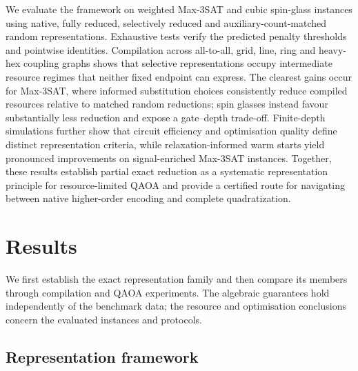 \documentclass[a4paper,onecolumn,11pt,unpublished]{quantumarticle}
\theoremstyle{remark}
\begin{document}
We evaluate the framework on weighted Max-3SAT and cubic spin-glass instances
using native, fully reduced, selectively reduced and auxiliary-count-matched
random representations. Exhaustive tests verify the predicted penalty
thresholds and pointwise identities. Compilation across all-to-all, grid,
line, ring and heavy-hex coupling graphs shows that selective representations
occupy intermediate resource regimes that neither fixed endpoint can express.
The clearest gains occur for Max-3SAT, where informed substitution choices
consistently reduce compiled resources relative to matched random reductions;
spin glasses instead favour substantially less reduction and expose a
gate--depth trade-off. Finite-depth simulations further show that circuit
efficiency and optimisation quality define distinct representation criteria,
while relaxation-informed warm starts yield pronounced improvements on
signal-enriched Max-3SAT instances. Together, these results establish partial
exact reduction as a systematic representation principle for resource-limited
QAOA and provide a certified route for navigating between native higher-order
encoding and complete quadratization.

\section{Results}
\label{sec:results}

We first establish the exact representation family and then compare its
members through compilation and QAOA experiments. The algebraic guarantees
hold independently of the benchmark data; the resource and optimisation
conclusions concern the evaluated instances and protocols.

\subsection{Representation framework}
\label{sec:preliminaries}
\label{sec:pb-diagonal}
\label{sec:pointwise-exactness}
\label{sec:resource-relaxation-data}
\end{document}
